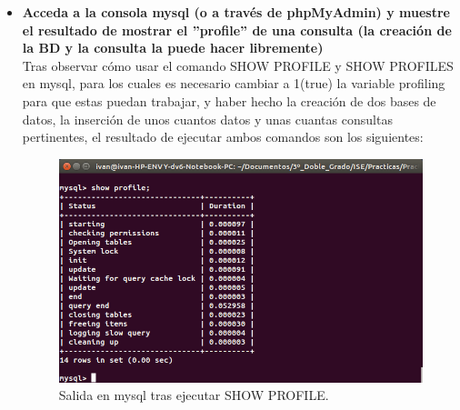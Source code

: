 \begin{itemize}
	\item \textbf{Acceda a la consola mysql (o a través de phpMyAdmin) y muestre el
		resultado de mostrar el ”profile” de una consulta (la creación de la BD y la consulta la
		puede hacer libremente)}\\
	
	Tras observar cómo usar el comando SHOW PROFILE y SHOW PROFILES en mysql\cite{mysqlProfile,mysqlProfiles}, para los cuales es necesario cambiar a 1(true) la variable profiling para que estas puedan trabajar, y haber hecho la creación de dos bases de datos, la inserción de unos cuantos datos y unas cuantas consultas pertinentes, el resultado de ejecutar ambos comandos son los siguientes:\\
	\begin{figure}[H]
	\centering
	\includegraphics[width=0.7\linewidth]{mysqlProfile}
	\caption[mysqlProfile]{Salida en mysql tras ejecutar SHOW PROFILE.}
	\label{fig:mysqlProfile}
	\end{figure}
	

\end{itemize}
